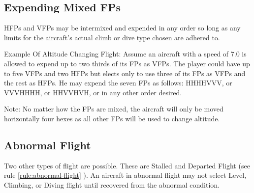\subsection{Expending Mixed FPs}
HFPs and VFPs may be intermixed and expended in any order so long as any limits for the aircraft's actual climb or dive type chosen are adhered to.

Example Of Altitude Changing Flight: Assume an aircraft with a speed of 7.0 is allowed to expend up to two thirds of its FPs as VFPs. The player could have up to five VFPs and two HFPs but elects only to use three of its FPs as VFPs and the rest as HFPs. He may expend the seven FPs as follows:
HHHHVVV, or VVVHHHH, or HHVVHVH, or in any other order desired.

Note: No matter how the FPs are mixed, the aircraft will only be moved horizontally four hexes as all other FPs will be used to change altitude.

\subsection{Abnormal Flight}
Two other types of flight are possible. These are Stalled and Departed Flight (see rule \ref{rule:abnormal-flight}
).  An aircraft in abnormal flight may not select Level, Climbing, or Diving flight until recovered from the abnormal condition.

